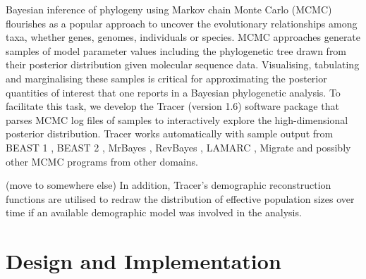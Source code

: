 \documentclass{bioinfo}
\begin{document}
Bayesian inference of phylogeny using Markov chain Monte Carlo (MCMC) \citep{rannala1996probability,mau1999bayesian} flourishes as a popular approach to uncover the evolutionary relationships among taxa, whether genes, genomes, individuals or species.
MCMC approaches generate samples of model parameter values including the phylogenetic tree drawn from their posterior distribution given molecular sequence data.
Visualising, tabulating and marginalising these samples is critical for approximating the posterior quantities of interest that one reports in a Bayesian phylogenetic analysis.
To facilitate this task, we develop the Tracer (version 1.6) software package that parses MCMC log files of samples to interactively explore the high-dimensional posterior distribution.
%
Tracer works automatically with sample output from
BEAST 1 \citep{drummond2012bayesian}, BEAST 2 \citep{bouckaert2014beast2}, MrBayes \citep{ronquist2012mrbayes}, RevBayes \citep{hohna2016revbayes}, LAMARC \citep{kuhner2006lamarc}, Migrate \citep{beerli2006comparison} and possibly other MCMC programs from other domains.

(move to somewhere else) In addition, Tracer's demographic reconstruction functions are utilised to redraw the distribution of effective population sizes over time if an available demographic model was involved in the analysis.



\section*{Design and Implementation}
\end{document}
